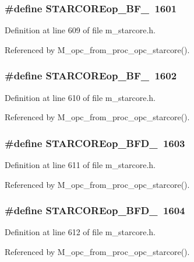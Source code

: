 \subsubsection{\setlength{\rightskip}{0pt plus 5cm}\#define STARCOREop\_\-BF\_~1601}\label{m__starcore_8h_3895b1798d9b73a80f48db310c505b27}




Definition at line 609 of file m\_\-starcore.h.

Referenced by M\_\-opc\_\-from\_\-proc\_\-opc\_\-starcore().
\subsubsection{\setlength{\rightskip}{0pt plus 5cm}\#define STARCOREop\_\-BF\_~1602}\label{m__starcore_8h_44861a0c7ed24d3450e555b6f91bc28a}




Definition at line 610 of file m\_\-starcore.h.

Referenced by M\_\-opc\_\-from\_\-proc\_\-opc\_\-starcore().
\subsubsection{\setlength{\rightskip}{0pt plus 5cm}\#define STARCOREop\_\-BFD\_~1603}\label{m__starcore_8h_a544880fe5a03e6bf8a16cc95d867cf4}




Definition at line 611 of file m\_\-starcore.h.

Referenced by M\_\-opc\_\-from\_\-proc\_\-opc\_\-starcore().
\subsubsection{\setlength{\rightskip}{0pt plus 5cm}\#define STARCOREop\_\-BFD\_~1604}\label{m__starcore_8h_20f47e07dcbb6d20ded985fd724a0850}




Definition at line 612 of file m\_\-starcore.h.

Referenced by M\_\-opc\_\-from\_\-proc\_\-opc\_\-starcore().

